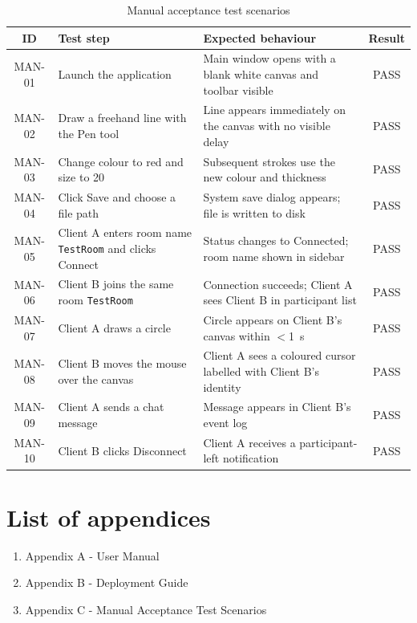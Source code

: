 \documentclass[a4paper,11pt,twoside]{report}
\theoremstyle{definition}
\begin{document}
\begin{table}[H]
    \centering
    \caption{Manual acceptance test scenarios}
    \begin{tabular}{|c|p{}|p{}|c|}
        \hline
        \textbf{ID} & \textbf{Test step} & \textbf{Expected behaviour} & \textbf{Result} \\
        \hline
        MAN-01 & Launch the application & Main window opens with a blank white canvas and toolbar visible & PASS \\
        \hline
        MAN-02 & Draw a freehand line with the Pen tool & Line appears immediately on the canvas with no visible delay & PASS \\
        \hline
        MAN-03 & Change colour to red and size to 20 & Subsequent strokes use the new colour and thickness & PASS \\
        \hline
        MAN-04 & Click Save and choose a file path & System save dialog appears; file is written to disk & PASS \\
        \hline
        MAN-05 & Client A enters room name \texttt{TestRoom} and clicks Connect & Status changes to Connected; room name shown in sidebar & PASS \\
        \hline
        MAN-06 & Client B joins the same room \texttt{TestRoom} & Connection succeeds; Client A sees Client B in participant list & PASS \\
        \hline
        MAN-07 & Client A draws a circle & Circle appears on Client B's canvas within $<$1~s & PASS \\
        \hline
        MAN-08 & Client B moves the mouse over the canvas & Client A sees a coloured cursor labelled with Client B's identity & PASS \\
        \hline
        MAN-09 & Client A sends a chat message & Message appears in Client B's event log & PASS \\
        \hline
        MAN-10 & Client B clicks Disconnect & Client A receives a participant-left notification & PASS \\
        \hline
    \end{tabular}
    \label{tab:manual-tests}
\end{table}

\chapter*{List of appendices}

\begin{enumerate}
\item Appendix A - User Manual
\item Appendix B - Deployment Guide
\item Appendix C - Manual Acceptance Test Scenarios
\end{enumerate}
\thispagestyle{empty}
\end{document}
